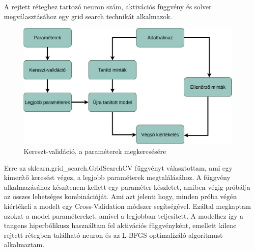 A rejtett réteghez tartozó neuron szám, aktivációs függvény és solver megválasztásához egy grid search technikát alkalmazok.
\begin{figure}[h!]
\centering
\includegraphics[scale=0.3]{images/gridSearch.png}
\caption{Kereszt-validáció, a paraméterek megkeresésére}
\label{fig:neuralnetwork}
\end{figure}

Erre az sklearn.grid\_search.GridSearchCV függvényt választottam, ami egy kimerítő keresést végez, a legjobb paraméterek megtalálásához. A függvény alkalmazásához készítenem kellett egy paraméter készletet, amiben végig próbálja az összes lehetséges kombinációját. Ami azt jelenti hogy, minden próba végén kiértékeli a modelt egy Cross-Validation módszer segítségével. Ezáltal megkaptam azokat a model paramétereket, amivel a legjobban teljesített.
A modelhez így a tangens hiperbólikusz használtam fel aktivációs függvényként, emellett kilenc rejtett rétegben található neuron és az L-BFGS optimalizáló algoritmust alkalmaztam.

